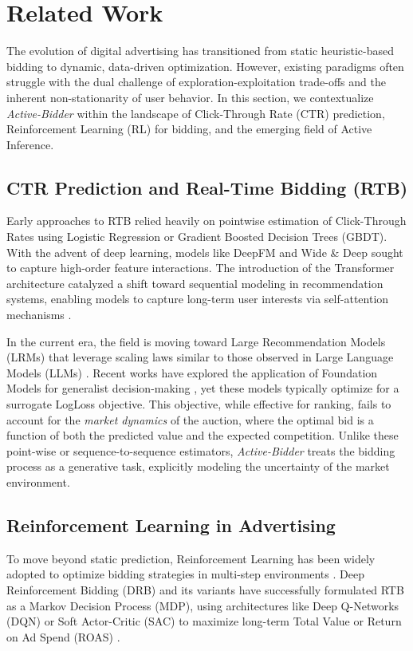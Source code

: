 \section{Related Work}

The evolution of digital advertising has transitioned from static heuristic-based bidding to dynamic, data-driven optimization. However, existing paradigms often struggle with the dual challenge of exploration-exploitation trade-offs and the inherent non-stationarity of user behavior. In this section, we contextualize \textit{Active-Bidder} within the landscape of Click-Through Rate (CTR) prediction, Reinforcement Learning (RL) for bidding, and the emerging field of Active Inference.

\subsection{CTR Prediction and Real-Time Bidding (RTB)}
Early approaches to RTB relied heavily on pointwise estimation of Click-Through Rates using Logistic Regression or Gradient Boosted Decision Trees (GBDT). With the advent of deep learning, models like DeepFM \citep{guo2017deepfm} and Wide \& Deep \citep{cheng2016wide} sought to capture high-order feature interactions. The introduction of the Transformer architecture \citep{vaswani2017attention} catalyzed a shift toward sequential modeling in recommendation systems, enabling models to capture long-term user interests via self-attention mechanisms \citep{zhou2018deep}.

In the current era, the field is moving toward Large Recommendation Models (LRMs) that leverage scaling laws similar to those observed in Large Language Models (LLMs) \citep{dubey2024llama, zhao2023survey}. Recent works have explored the application of Foundation Models for generalist decision-making \citep{wang2024generalist, pathak2024foundation}, yet these models typically optimize for a surrogate LogLoss objective. This objective, while effective for ranking, fails to account for the \textit{market dynamics} of the auction, where the optimal bid is a function of both the predicted value and the expected competition. Unlike these point-wise or sequence-to-sequence estimators, \textit{Active-Bidder} treats the bidding process as a generative task, explicitly modeling the uncertainty of the market environment.

\subsection{Reinforcement Learning in Advertising}
To move beyond static prediction, Reinforcement Learning has been widely adopted to optimize bidding strategies in multi-step environments \citep{sutton2018reinforcement}. Deep Reinforcement Bidding (DRB) and its variants have successfully formulated RTB as a Markov Decision Process (MDP), using architectures like Deep Q-Networks (DQN) or Soft Actor-Critic (SAC) to maximize long-term Total Value or Return on Ad Spend (ROAS) \citep{wu2018deep}.


